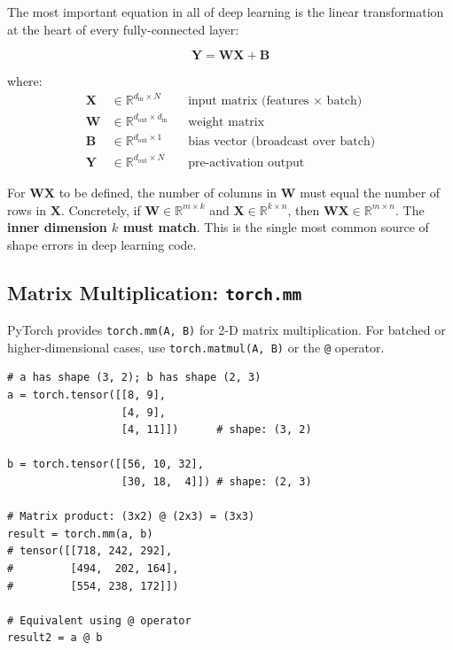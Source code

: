 \documentclass[12pt,a4paper]{article}
\newcommand{\tbf}[1]{\textbf{#1}}
\newcommand{\ttt}[1]{\texttt{#1}}
\begin{document}
The most important equation in all of deep learning is the linear
transformation at the heart of every fully-connected layer:

\begin{equation}
  \label{eq:linear}
  \mathbf{Y} = \mathbf{W} \mathbf{X} + \mathbf{B}
\end{equation}

where:
\begin{align}
  \mathbf{X} &\in \mathbb{R}^{d_{\text{in}} \times N} && \text{input matrix (features $\times$ batch)} \label{eq:X}\\
  \mathbf{W} &\in \mathbb{R}^{d_{\text{out}} \times d_{\text{in}}} && \text{weight matrix} \label{eq:W}\\
  \mathbf{B} &\in \mathbb{R}^{d_{\text{out}} \times 1} && \text{bias vector (broadcast over batch)} \label{eq:B}\\
  \mathbf{Y} &\in \mathbb{R}^{d_{\text{out}} \times N} && \text{pre-activation output} \label{eq:Y}
\end{align}

\begin{keyinsight}[title=Dimensions Must Be Compatible]
For $\mathbf{W}\mathbf{X}$ to be defined, the number of columns in $\mathbf{W}$
must equal the number of rows in $\mathbf{X}$. Concretely, if
$\mathbf{W} \in \mathbb{R}^{m \times k}$ and $\mathbf{X} \in \mathbb{R}^{k \times n}$,
then $\mathbf{W}\mathbf{X} \in \mathbb{R}^{m \times n}$. The \tbf{inner
dimension $k$ must match}. This is the single most common source of shape
errors in deep learning code.
\end{keyinsight}

\subsection{Matrix Multiplication: \ttt{torch.mm}}
\label{subsec:mm}

PyTorch provides \ttt{torch.mm(A, B)} for 2-D matrix multiplication. For
batched or higher-dimensional cases, use \ttt{torch.matmul(A, B)} or the
\ttt{@} operator.

\begin{lstlisting}[caption={\ttt{torch.mm} matrix multiplication (V14, 01:00:06).},
                   label={lst:mm}]
# a has shape (3, 2); b has shape (2, 3)
a = torch.tensor([[8, 9],
                  [4, 9],
                  [4, 11]])      # shape: (3, 2)

b = torch.tensor([[56, 10, 32],
                  [30, 18,  4]]) # shape: (2, 3)

# Matrix product: (3x2) @ (2x3) = (3x3)
result = torch.mm(a, b)
# tensor([[718, 242, 292],
#         [494,  202, 164],
#         [554, 238, 172]])

# Equivalent using @ operator
result2 = a @ b
\end{lstlisting}
\end{document}

